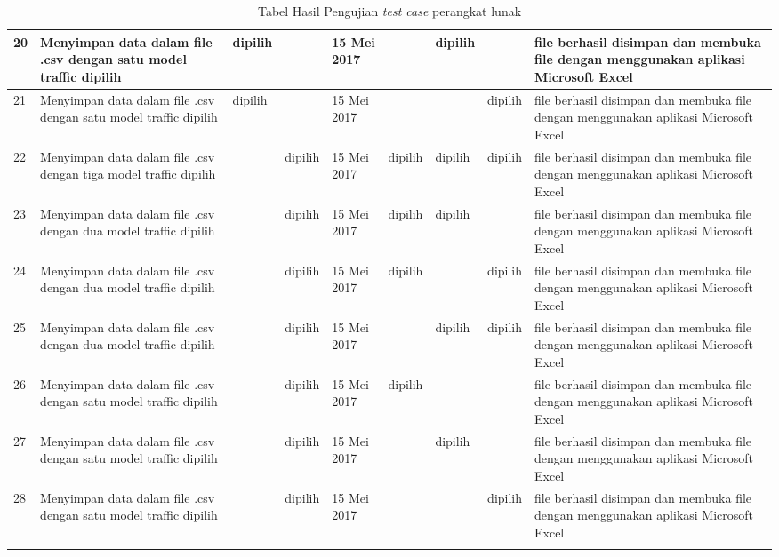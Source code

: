 \begin{longtable}{|p{0.5cm}|p{2cm}|p{1.3cm}|p{1.3cm}|p{1.5cm}|p{1.8cm}|p{1.8cm}|p{1.8cm}|p{2cm}|}
        20 & Menyimpan data dalam file .csv dengan satu model traffic dipilih & dipilih & ~ & 15 Mei 2017 & ~ & dipilih & ~ & file berhasil disimpan dan membuka file dengan menggunakan aplikasi Microsoft Excel \\ \hline
        21 & Menyimpan data dalam file .csv dengan satu model traffic dipilih & dipilih & ~ & 15 Mei 2017 & ~ & ~ & dipilih & file berhasil disimpan dan membuka file dengan menggunakan aplikasi Microsoft Excel \\ \hline
        22 & Menyimpan data dalam file .csv dengan tiga model traffic dipilih & ~ & dipilih & 15 Mei 2017 & dipilih & dipilih & dipilih & file berhasil disimpan dan membuka file dengan menggunakan aplikasi Microsoft Excel \\ \hline
        23 & Menyimpan data dalam file .csv dengan dua model traffic dipilih & ~ & dipilih & 15 Mei 2017 & dipilih & dipilih & ~ & file berhasil disimpan dan membuka file dengan menggunakan aplikasi Microsoft Excel \\ \hline
        24 & Menyimpan data dalam file .csv dengan dua model traffic dipilih & ~ & dipilih & 15 Mei 2017 & dipilih & ~ & dipilih & file berhasil disimpan dan membuka file dengan menggunakan aplikasi Microsoft Excel \\ \hline
        25 & Menyimpan data dalam file .csv dengan dua model traffic dipilih & ~ & dipilih & 15 Mei 2017 & ~ & dipilih & dipilih & file berhasil disimpan dan membuka file dengan menggunakan aplikasi Microsoft Excel \\ \hline
        26 & Menyimpan data dalam file .csv dengan satu model traffic dipilih & ~ & dipilih & 15 Mei 2017 & dipilih & ~ & ~ & file berhasil disimpan dan membuka file dengan menggunakan aplikasi Microsoft Excel \\ \hline
        27 & Menyimpan data dalam file .csv dengan satu model traffic dipilih & ~ & dipilih & 15 Mei 2017 & ~ & dipilih & ~ & file berhasil disimpan dan membuka file dengan menggunakan aplikasi Microsoft Excel \\ \hline
        28 & Menyimpan data dalam file .csv dengan satu model traffic dipilih & ~ & dipilih & 15 Mei 2017 & ~ & ~ & dipilih & file berhasil disimpan dan membuka file dengan menggunakan aplikasi Microsoft Excel \\ \hline
	\caption {Tabel Hasil Pengujian \textit{test case} perangkat lunak}
		\label{tab:pengujian2}
		\end{longtable}%
